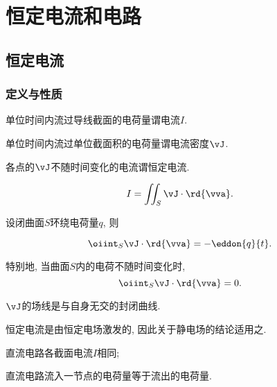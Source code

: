 \documentclass[../Electromagnetism.tex]{subfiles}
\begin{document}
\graphicspath{{ElectricCurrentAndCircuits/src/}{src/}}

\section{恒定电流和电路} %
\label{sec:恒定电流和电路}

\subsection{恒定电流} %
\label{sub:恒定电流}

\subsubsection{定义与性质} %
\label{ssub:定义与性质}

\begin{definition}[电流]
	单位时间内流过导线截面的电荷量谓电流$I$.
\end{definition}


\begin{definition}[电流密度]
	单位时间内流过单位截面积的电荷量谓电流密度$\vJ$.
\end{definition}
\begin{definition}[恒定电流]
	各点的$\vJ$不随时间变化的电流谓恒定电流.
\end{definition}
\begin{corollary}[电流作为通量]\quad
	\[ I = \iint_S \vJ\cdot\rd{\vva}. \]
\end{corollary}
\begin{corollary}[电荷守恒定律]
	设闭曲面$S$环绕电荷量$q$, 则
	\begin{finale}
		\[ \oiint_S \vJ\cdot\rd{\vva} = -\eddon{q}{t}. \]
	\end{finale}
	特别地, 当曲面$S$内的电荷不随时间变化时,
	\[ \oiint_S \vJ\cdot\rd{\vva} = 0. \]
\end{corollary}
\begin{corollary}[电流线的性质]
	$\vJ$的场线是与自身无交的封闭曲线.
\end{corollary}
\begin{remark}
	恒定电流是由恒定电场激发的, 因此关于静电场的结论适用之.
\end{remark}
\begin{corollary}\quad
	\begin{cenum}
		\item 直流电路各截面电流$I$相同;
		\item 直流电路流入一节点的电荷量等于流出的电荷量.
	\end{cenum}
\end{corollary}
\end{document}
